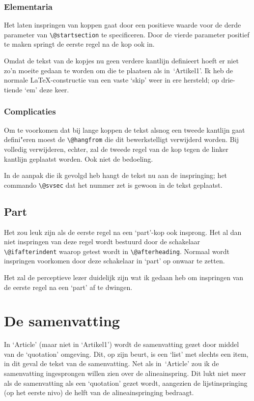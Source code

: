 \documentclass[a4paper]{artikel1} %
\begin{document}
\subsubsection{Elementaria}
 
Het laten inspringen van koppen gaat door een positieve waarde voor de
derde parameter van \verb.\@startsection.  te specificeren. Door de
vierde parameter positief te maken springt de eerste regel na de kop
ook in.
 
Omdat de tekst van de kopjes nu geen verdere kantlijn definieert hoeft
er niet zo'n moeite gedaan te worden om die te plaatsen als
in~`Artikel1'. Ik heb de normale \LaTeX-constructie van een vaste
`skip' weer in ere hersteld; op drie-tiende `em' deze keer.
 
\subsubsection{Complicaties}
 
Om te voorkomen dat bij lange koppen de tekst alsnog een tweede
kantlijn gaat defini"eren moest de \verb.\@hangfrom. die dit
bewerkstelligt verwijderd worden. Bij volledig verwijderen, echter,
zal de tweede regel van de kop tegen de linker kantlijn geplaatst
worden.  Ook niet de bedoeling.
 
In de aanpak die ik gevolgd heb hangt de tekst nu aan de inspringing;
het commando \verb.\@svsec. dat het nummer zet is gewoon in de tekst
geplaatst.
 
 
\subsection{Part}
 
Het zou leuk zijn als de eerste regel na een `part'-kop ook insprong.
Het al dan niet inspringen van deze regel wordt bestuurd door de
schakelaar \verb.\@ifafterindent.  waarop getest wordt in
\verb.\@afterheading..  Normaal wordt inspringen voorkomen door deze
schakelaar in `part' op onwaar te zetten.
 
Het zal de perceptieve lezer duidelijk zijn wat ik gedaan heb om
inspringen van de eerste regel na een `part' af te dwingen.
 
\section{De samenvatting}
 
In `Article' (maar niet in `Artikel1') wordt de samenvatting gezet
door middel van de `quotation' omgeving. Dit, op zijn beurt, is een
`list' met slechts een item, in dit geval de tekst van de
samenvatting. Net als in~`Article' zou ik de samenvatting ingesprongen
willen zien over de alineainspring. Dit lukt niet meer als de
samenvatting als een `quotation' gezet wordt, aangezien de
lijstinspringing (op het eerste nivo) de helft van de
alineainspringing bedraagt.
 
\end{document}
